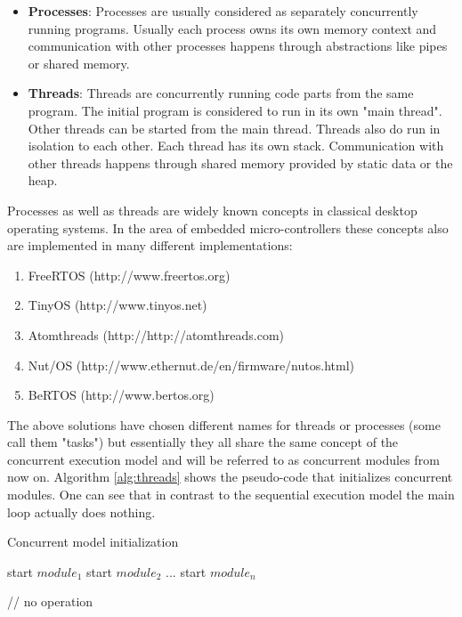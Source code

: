\begin{itemize}
\item \textbf{Processes}: Processes are usually considered as separately concurrently running programs. Usually each process owns its own memory context and communication with other processes happens through abstractions like pipes or shared memory.
\item \textbf{Threads}: Threads are concurrently running code parts from the same program. The initial program is considered to run in its own "main thread". Other threads can be started from the main thread. Threads also do run in isolation to each other. Each thread has its own stack. Communication with other threads happens through shared memory provided by static data or the heap.
\end{itemize}

Processes as well as threads are widely known concepts in classical desktop operating systems. In the area of embedded micro-controllers these concepts also are implemented in many different implementations:

\begin{enumerate}
\item FreeRTOS (http://www.freertos.org)
\item TinyOS (http://www.tinyos.net)
\item Atomthreads (http://http://atomthreads.com)
\item Nut/OS (http://www.ethernut.de/en/firmware/nutos.html)
\item BeRTOS (http://www.bertos.org)
\end{enumerate}

The above solutions have chosen different names for threads or processes (some call them "tasks") but essentially they all share the same concept of the concurrent execution model and will be referred to as concurrent modules from now on. Algorithm \ref{alg:threads} shows the pseudo-code that initializes concurrent modules. One can see that in contrast to the sequential execution model the main loop actually does nothing.

\begin{algorithm}[H]
\caption{Concurrent model initialization}
\label{alg:threads}
\begin{algorithmic}

\STATE start $module_1$
\STATE start $module_2$
\STATE ...
\STATE start $module_n$

    \STATE // no operation
\ENDWHILE
\end{algorithmic}
\end{algorithm}

